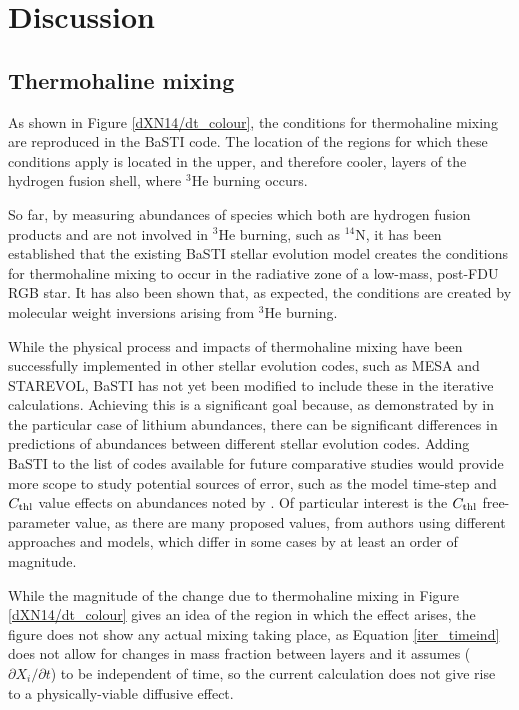 \documentclass[12pt, a4paper]{report}
\begin{document}
\chapter{Discussion}
\section{Thermohaline mixing}
As shown in Figure \ref{dXN14/dt_colour}, the conditions for thermohaline mixing are reproduced in the BaSTI code. The location of the regions for which these conditions apply is located in the upper, and therefore cooler, layers of the hydrogen fusion shell, where $^{3}$He burning occurs.

So far, by measuring abundances of species which both are hydrogen fusion products and are not involved in $^{3}$He burning, such as $^{14}$N, it has been established that the existing BaSTI stellar evolution model creates the conditions for thermohaline mixing to occur in the radiative zone of a low-mass, post-FDU RGB star. It has also been shown that, as expected, the conditions are created by molecular weight inversions arising from $^{3}$He burning.

While the physical process and impacts of thermohaline mixing have been successfully implemented in other stellar evolution codes, such as MESA and STAREVOL, BaSTI has not yet been modified to include these in the iterative calculations. Achieving this is a significant goal because, as demonstrated by \cite{2015MNRAS.446.2673L} in the particular case of lithium abundances, there can be significant differences in predictions of abundances between different stellar evolution codes. Adding BaSTI to the list of codes available for future comparative studies would provide more scope to study potential sources of error, such as the model time-step and $C_{\textnormal{thl}}$ value effects on abundances noted by \cite{2015MNRAS.446.2673L}. Of particular interest is the $C_{\textnormal{thl}}$ free-parameter value, as there are many proposed values, from authors using different approaches and models, which differ in some cases by at least an order of magnitude.

While the magnitude of the change due to thermohaline mixing in Figure \ref{dXN14/dt_colour} gives an idea of the region in which the effect arises, the figure does not show any actual mixing taking place, as Equation \ref{iter_timeind} does not allow for changes in mass fraction between layers and it assumes ($\partial X_{i}/\partial t$) to be independent of time, so the current calculation does not give rise to a physically-viable diffusive effect.
\cite{2010A&A...521A...9C}
\end{document}
